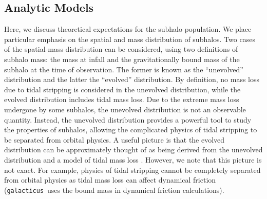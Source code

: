 \documentclass[%
 reprint,
 amsmath,
 amssymb,
 aps,
prd,
twocolumn,
superscriptaddress,
preprintnumbers,
floatfix,
nofootinbib
]{revtex4-2}
\def\gal{{\tt galacticus}~}
\begin{document}
\subsection{Analytic Models}\label{sec_methods_analytic}
Here, we discuss theoretical expectations for the subhalo population. 
We place particular emphasis on the spatial and mass distribution of subhalos.
Two cases of the spatial-mass distribution can be considered, using two definitions of subhalo mass: the mass at infall and the gravitationally bound mass of the subhalo at the time of observation.
The former is known as the ``unevolved'' distribution and the latter the ``evolved'' distribution.
By definition, no mass loss due to tidal stripping is considered in the unevolved distribution, while the evolved distribution includes tidal mass loss.
Due to the extreme mass loss undergone by some subhalos, the unevolved distribution is not an observable quantity.
Instead, the unevolved distribution provides a powerful tool to study the properties of subhalos, allowing the complicated physics of tidal stripping to be separated from orbital physics.
A useful picture is that the evolved distribution can be approximately thought of as being derived from the unevolved distribution and a model of tidal mass loss \citep{10.1093/mnras/stv2900,du2025faster}.
However, we note that this picture is not exact. 
For example, physics of tidal stripping cannot be completely separated from orbital physics as tidal mass loss can affect dynamical friction (\gal uses the bound mass in dynamical friction calculations).
\end{document}
